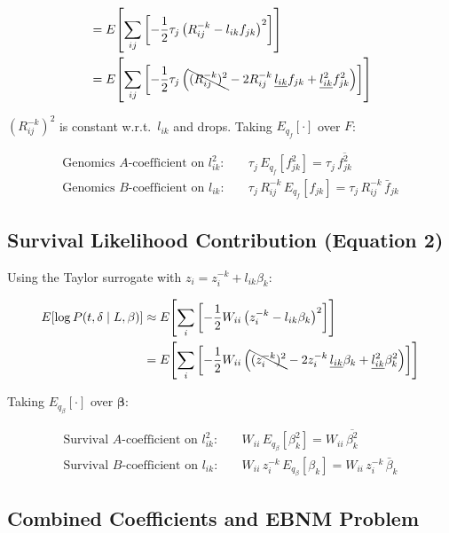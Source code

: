 \documentclass{article}[12pt]
\newcommand{\fbar}[2]{\bar{f}_{#1#2}}
\newcommand{\bbar}[1]{\bar{\beta}_{#1}}
\newcommand{\fsec}[2]{\overline{f^{2}_{#1#2}}}
\newcommand{\bsec}[1]{\overline{\beta^{2}_{#1}}}
\begin{document}
\begin{align}
    &= E\!\left[\sum_{ij}\left[-\frac{1}{2}\tau_j
       \left(R^{-k}_{ij} - l_{ik}f_{jk}\right)^2\right]\right]\\
    &= E\!\left[\sum_{ij}\left[-\frac{1}{2}\tau_j
       \left(\bcancel{(R^{-k}_{ij})^2}
             - 2R^{-k}_{ij}\,\underline{l_{ik}}f_{jk}
             + \underline{l_{ik}^{2}}f_{jk}^{2}\right)\right]\right]
\end{align}

$(R^{-k}_{ij})^2$ is constant w.r.t.\ $l_{ik}$ and drops.  Taking
$E_{q_f}[\cdot]$ over $F$:

\begin{align}
    \text{Genomics }A\text{-coefficient on }l_{ik}^2:\quad &
    \tau_j\,E_{q_f}\!\left[f_{jk}^{2}\right] = \tau_j\,\fsec{j}{k}\\
    \text{Genomics }B\text{-coefficient on }l_{ik}:\quad &
    \tau_j\,R^{-k}_{ij}\,E_{q_f}\!\left[f_{jk}\right] = \tau_j\,R^{-k}_{ij}\,\fbar{j}{k}
\end{align}

\subsection{Survival Likelihood Contribution (Equation 2)}

Using the Taylor surrogate with $z_i = z^{-k}_i + l_{ik}\beta_k$:

\begin{align}
    E\!\left[\log P(t, \delta \mid L, \beta)\right]
    &\approx E\!\left[\sum_i\left[-\frac{1}{2}W_{ii}
       \left(z^{-k}_i - l_{ik}\beta_k\right)^2\right]\right]\\
    &= E\!\left[\sum_i\left[-\frac{1}{2}W_{ii}
       \left(\bcancel{(z^{-k}_i)^2}
             - 2z^{-k}_{i}\,\underline{l_{ik}}\beta_k
             + \underline{l_{ik}^{2}}\beta_k^{2}\right)\right]\right]
\end{align}

Taking $E_{q_\beta}[\cdot]$ over $\bm{\beta}$:

\begin{align}
    \text{Survival }A\text{-coefficient on }l_{ik}^2:\quad &
    W_{ii}\,E_{q_\beta}\!\left[\beta_k^{2}\right] = W_{ii}\,\bsec{k}\\
    \text{Survival }B\text{-coefficient on }l_{ik}:\quad &
    W_{ii}\,z^{-k}_{i}\,E_{q_\beta}\!\left[\beta_k\right] = W_{ii}\,z^{-k}_{i}\,\bbar{k}
\end{align}

\subsection{Combined Coefficients and EBNM Problem}
\end{document}
